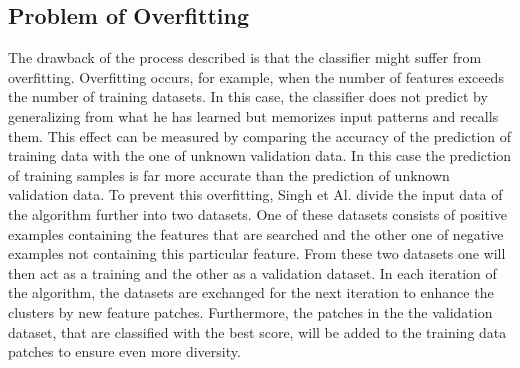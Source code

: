 \subsection{Problem of Overfitting}

The drawback of the process described is that the classifier might suffer from overfitting. Overfitting occurs, for example, when the number of features exceeds the number of training datasets. In this case, the classifier does not predict by generalizing from what he has learned but memorizes input patterns and recalls them. This effect can be measured by comparing the accuracy of the prediction of training data with the one of unknown validation data. In this case the prediction of training samples is far more accurate than the prediction of unknown validation data. To prevent this overfitting, Singh et Al. \cite{Singh2012DiscPat} divide the input data of the algorithm further into two datasets. One of these datasets consists of positive examples containing the features that are searched and the other one of negative examples not containing this particular feature. From these two datasets one will then act as a training and the other as a validation dataset. In each iteration of the algorithm, the datasets are exchanged for the next iteration to enhance the clusters by new feature patches. Furthermore, the patches in the the validation dataset, that are classified with the best score, will be added to the training data patches to ensure even more diversity.

